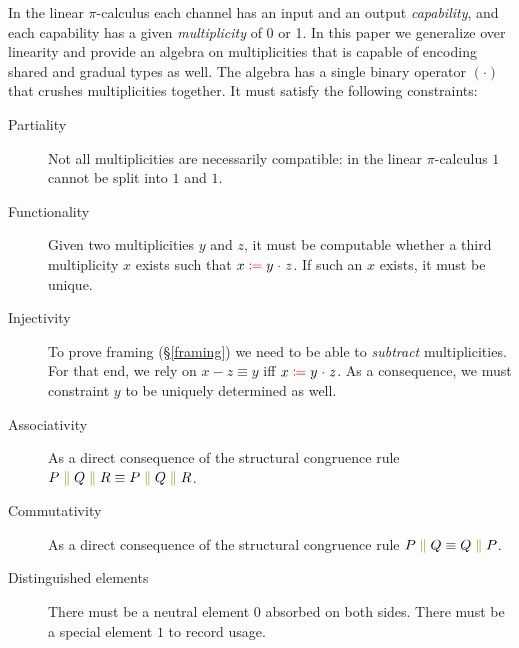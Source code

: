 \documentclass[a4paper,UKenglish,cleveref, autoref, thm-restate,authorcolumns]{lipics-v2019}
\theoremstyle{definition}
\newcommand{\picalc}{$\pi$-calculus}
\newcommand{\constr}[1]{\textcolor{olive}{\operatorname{#1}}}
\newcommand{\field}[1]{\textcolor{red}{\operatorname{#1}}}
\newcommand{\comp}[2]{#1 \; \constr{\parallel} \; #2}
\newcommand{\op}[3]{#1 \; \field{\coloneqq} \; #2 \; \field{\cdot} \; #3}
\begin{document}
In the linear \picalc{} each channel has an input and an output \emph{capability}, and each capability has a given \emph{multiplicity} of 0 or 1.
In this paper we generalize over linearity and provide an algebra on multiplicities that is capable of encoding shared and gradual types as well.
The algebra has a single binary operator $(\cdot)$ that crushes multiplicities together.
It must satisfy the following constraints:
\begin{description}

\item [Partiality]
  Not all multiplicities are necessarily compatible: in the linear \picalc{} $1$ cannot be split into $1$ and $1$.
\item [Functionality]
  Given two multiplicities $y$ and $z$, it must be computable whether a third multiplicity $x$ exists such that $\op{x}{y}{z}$.
  If such an $x$ exists, it must be unique.
    
\item [Injectivity]
  To prove framing (\S \ref{framing}) we need to be able to \emph{subtract} multiplicities.
  For that end, we rely on $x - z \equiv y$ iff $\op{x}{y}{z}$.
  As a consequence, we must constraint $y$ to be uniquely determined as well.

\item [Associativity]
  As a direct consequence of the structural congruence rule $\comp{P}{\comp{Q}{R}} \equiv \comp{\comp{P}{Q}}{R}$.

\item [Commutativity]
  As a direct consequence of the structural congruence rule $\comp{P}{Q} \equiv \comp{Q}{P}$.

\item [Distinguished elements]
  There must be a neutral element $0$ absorbed on both sides.
  There must be a special element $1$ to record usage.
\end{description}

\end{document}
